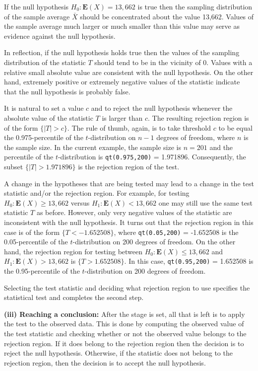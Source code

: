 \documentclass[
]{krantz}
\newcommand{\Expec}{\mathbf{E}}
\theoremstyle{definition}
\theoremstyle{definition}
\theoremstyle{definition}
\theoremstyle{remark}
\begin{document}
If the null hypothesis \(H_0:\Expec(X) = 13,662\) is true then the
sampling distribution of the sample average \(\bar X\) should be
concentrated about the value 13,662. Values of the sample average much
larger or much smaller than this value may serve as evidence against the
null hypothesis.

In reflection, if the null hypothesis holds true then the values of the
sampling distribution of the statistic \(T\) should tend to be in the
vicinity of 0. Values with a relative small absolute value are
consistent with the null hypothesis. On the other hand, extremely
positive or extremely negative values of the statistic indicate that the
null hypothesis is probably false.

It is natural to set a value \(c\) and to reject the null hypothesis
whenever the absolute value of the statistic \(T\) is larger than \(c\). The
resulting rejection region is of the form \(\{|T| > c\}\). The rule of
thumb, again, is to take threshold \(c\) to be equal the 0.975-percentile
of the \(t\)-distribution on \(n-1\) degrees of freedom, where \(n\) is the
sample size. In the current example, the sample size is \(n=201\) and the
percentile of the \(t\)-distribution is \texttt{qt(0.975,200)} = 1.971896.
Consequently, the subset \(\{|T| > 1.971896\}\) is the rejection region of
the test.

A change in the hypotheses that are being tested may lead to a change in
the test statistic and/or the rejection region. For example, for testing
\(H_0: \Expec(X) \geq 13,662\) versus \(H_1: \Expec(X) < 13,662\) one may
still use the same test statistic \(T\) as before. However, only very
negative values of the statistic are inconsistent with the null
hypothesis. It turns out that the rejection region in this case is of
the form \(\{T < -1.652508\}\), where \texttt{qt(0.05,200)} = -1.652508 is the
0.05-percentile of the \(t\)-distribution on 200 degrees of freedom. On
the other hand, the rejection region for testing between
\(H_0: \Expec(X) \leq 13,662\) and \(H_1: \Expec(X) > 13,662\) is
\(\{T > 1.652508\}\). In this case, \texttt{qt(0.95,200)} = 1.652508 is the
0.95-percentile of the \(t\)-distribution on 200 degrees of freedom.

Selecting the test statistic and deciding what rejection region to use
specifies the statistical test and completes the second step.

{\textbf{(iii) Reaching a conclusion:}} After the stage is set, all that is
left is to apply the test to the observed data. This is done by
computing the observed value of the test statistic and checking whether
or not the observed value belongs to the rejection region. If it does
belong to the rejection region then the decision is to reject the null
hypothesis. Otherwise, if the statistic does not belong to the rejection
region, then the decision is to accept the null hypothesis.
\end{document}
